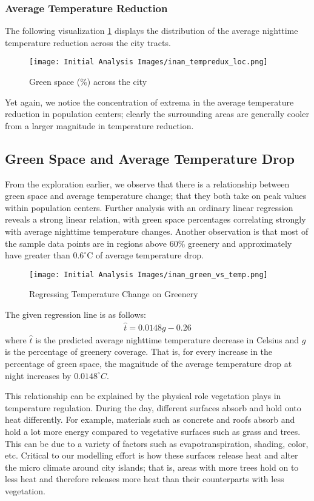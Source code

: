 \documentclass[11pt]{article}
\begin{document}
\subsubsection{Average Temperature Reduction}
The following visualization \ref{fig:greenspacelocation} displays the distribution of the average nighttime temperature reduction across the city tracts.
\begin{figure}[H]
    \centering
    \texttt{[image: Initial Analysis Images/inan\_tempredux\_loc.png]}
    \caption{Green space (\%) across the city}
    \label{fig:greenspacelocation}
\end{figure}
Yet again, we notice the concentration of extrema in the average temperature reduction in population centers; clearly the surrounding areas are generally cooler from a larger magnitude in temperature reduction.

\subsection{Green Space and Average Temperature Drop}
From the exploration earlier, we observe that there is a relationship between green space and average temperature change; that they both take on peak values within population centers. Further analysis with an ordinary linear regression reveals a strong linear relation, with green space percentages correlating strongly with average nighttime temperature changes. Another observation is that most of the sample data points are in regions above 60\% greenery and approximately have greater than $0.6^{\circ}$C of average temperature drop.
\begin{figure}[H]
    \centering
    \texttt{[image: Initial Analysis Images/inan\_green\_vs\_temp.png]}
    \caption{Regressing Temperature Change on Greenery}
    \label{fig:greenvstemp}
\end{figure}

\noindent The given regression line is as follows:
\begin{align}
    \hat{t} = 0.0148g - 0.26
\end{align}
where $\hat{t}$ is the predicted average nighttime temperature decrease in Celsius and $g$ is the percentage of greenery coverage. That is, for every increase in the percentage of green space, the magnitude of the average temperature drop at night increases by $0.0148^\circ C$.

This relationship can be explained by the physical role vegetation plays in temperature regulation. During the day, different surfaces absorb and hold onto heat differently. For example, materials such as concrete and roofs absorb and hold a lot more energy compared to vegetative surfaces such as grass and trees. This can be due to a variety of factors such as evapotranspiration, shading, color, etc. Critical to our modelling effort is how these surfaces release heat and alter the micro climate around city islands; that is, areas with more trees hold on to less heat and therefore releases more heat than their counterparts with less vegetation.
\end{document}
